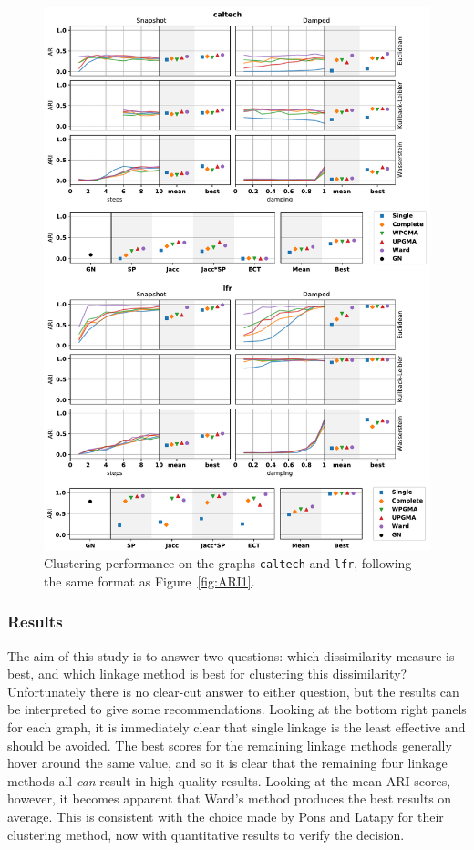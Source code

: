 \begin{figure}
  \centering
  \includegraphics[height=.95\textheight]{power/ARI2.pdf}
  \caption[Experimental clustering results for \texttt{caltech} and \texttt{lfr}]{Clustering performance on the graphs \texttt{caltech} and \texttt{lfr}, following the same format as Figure~\ref{fig:ARI1}.}
  \label{fig:ARI2}
\end{figure}

\subsubsection{Results}
The aim of this study is to answer two questions: which dissimilarity measure is best, and which linkage method is best for clustering this dissimilarity?
Unfortunately there is no clear-cut answer to either question, but the results can be interpreted to give some recommendations. Looking at the bottom right panels for each graph, it is immediately clear that single linkage is the least effective and should be avoided. The best scores for the remaining linkage methods generally hover around the same value, and so it is clear that the remaining four linkage methods all \emph{can} result in high quality results. Looking at the mean ARI scores, however, it becomes apparent that Ward's method produces the best results on average. This is consistent with the choice made by Pons and Latapy \cite{Pons2006} for their clustering method, now with quantitative results to verify the decision.

